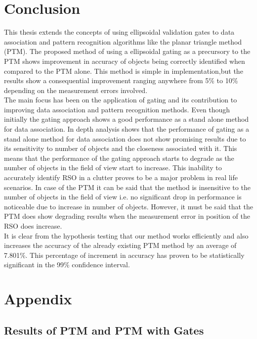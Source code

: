 \documentclass[]{aiaa-tc}%
\begin{document}
\section{Conclusion}

This thesis extends the concepts of using ellipsoidal validation gates to data association and pattern recognition algorithms like the planar triangle method (PTM). The proposed method of using a ellipsoidal gating as a precursory to the PTM shows improvement in accuracy of objects being correctly identified when compared to the PTM alone. This method is simple in implementation,but the results show a consequential improvement ranging anywhere from 5\% to 10\% depending on the measurement errors involved.\\

The main focus has been on the application of gating and its contribution to improving data association and pattern recognition methods. Even though initially the gating approach shows a good performance as a stand alone method for data association. In depth analysis shows that the performance of gating as a stand alone method for data association does not show promising results due to its sensitivity to number of objects and the closeness associated with it. This means that  the performance of the gating approach starts to degrade as the number of objects in the field of view start to increase. This inability to accurately identify RSO in a clutter proves to be a major problem in real life scenarios. In case of the PTM it can be said that the method is insensitive to the number of objects in the field of view i.e. no significant drop in performance is noticeable due to increase in number of objects. However, it must be said that the PTM does show degrading results when the measurement error in position of the RSO does increase.\\

It is clear from the hypothesis testing that our method works efficiently and also increases the accuracy of the already existing PTM method by an average of 7.801\%. This percentage of increment in accuracy has proven to be statistically significant in the 99\% confidence interval.






\newpage
\section*{Appendix}
\subsection{Results of PTM and PTM with Gates}
\end{document}
